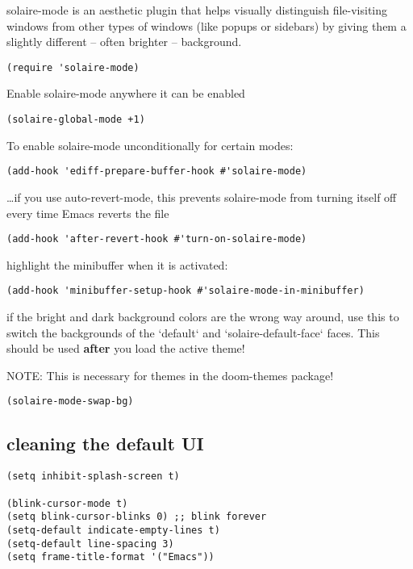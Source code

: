 \documentclass[11pt]{article}
\begin{document}
solaire-mode is an aesthetic plugin that helps visually distinguish file-visiting windows from other types of windows (like popups or sidebars) by giving them a slightly different -- often brighter -- background.

\begin{verbatim}
(require 'solaire-mode)
\end{verbatim}

Enable solaire-mode anywhere it can be enabled
\begin{verbatim}
(solaire-global-mode +1)
\end{verbatim}

To enable solaire-mode unconditionally for certain modes:
\begin{verbatim}
(add-hook 'ediff-prepare-buffer-hook #'solaire-mode)
\end{verbatim}


\ldots{}if you use auto-revert-mode, this prevents solaire-mode from turning itself off every time Emacs reverts the file
\begin{verbatim}
(add-hook 'after-revert-hook #'turn-on-solaire-mode)
\end{verbatim}

highlight the minibuffer when it is activated:
\begin{verbatim}
(add-hook 'minibuffer-setup-hook #'solaire-mode-in-minibuffer)
\end{verbatim}

if the bright and dark background colors are the wrong way around, use this
to switch the backgrounds of the `default` and `solaire-default-face` faces.
This should be used \textbf{after} you load the active theme!

NOTE: This is necessary for themes in the doom-themes package!
\begin{verbatim}
(solaire-mode-swap-bg)
\end{verbatim}

\subsection*{cleaning the default UI}
\label{sec:org55301aa}

\begin{verbatim}
(setq inhibit-splash-screen t)

(blink-cursor-mode t)
(setq blink-cursor-blinks 0) ;; blink forever
(setq-default indicate-empty-lines t)
(setq-default line-spacing 3)
(setq frame-title-format '("Emacs"))
\end{verbatim}
\end{document}
